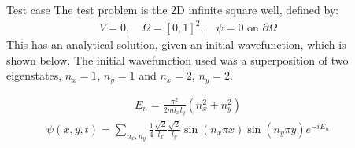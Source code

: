 \documentclass[final]{beamer}
\newlength{\sepwid}
\newlength{\onecolwid}
\newlength{\twocolwid}
\begin{document}
\begin{frame}[t]
\begin{columns}[t]
\begin{column}{\onecolwid}
\end{column} %

\begin{column}{\sepwid}\end{column} %

\begin{column}{\twocolwid} %

\begin{columns}[t,totalwidth=\twocolwid] %

\begin{column}{\onecolwid}\vspace{-.6in} %

\begin{block}{Test case}
The test problem is the 2D infinite square well, defined by:
\begin{gather}
V=0,\quad\Omega=\left[0,1\right]^{2},\quad\psi = 0\text{ on } \partial\Omega
\end{gather}
This has an analytical solution, given an initial wavefunction, which is shown below. The initial wavefunction used was a superposition of two eigenstates, $n_x=1$, $n_y=1$ and $n_x=2$, $n_y=2$.

\begin{gather}
E_n = \frac{\pi^2}{2 m l_x l_y}(n_x^2 + n_y^2)
\end{gather}
\begin{gather}
\psi(x,y,t) = \sum_{n_x, n_y} \frac{1}{4} \frac{\sqrt{2}}{l_x} \frac{\sqrt{2}}{l_y} \sin(n_x \pi x) \sin(n_y \pi y) e^{-i E_n }
\end{gather}


\end{block}
\end{column}
\end{columns}
\end{column}
\end{columns}
\end{frame}
\end{document}
